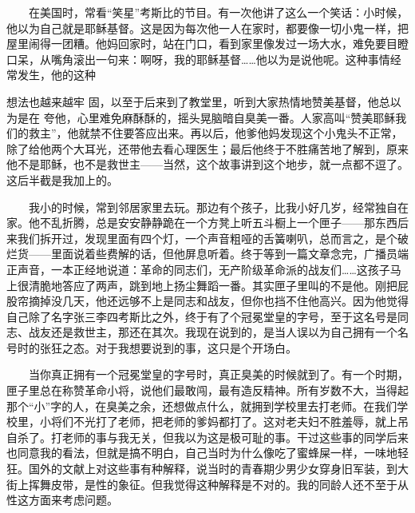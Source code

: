 　　在美国时，常看“笑星”考斯比的节目。有一次他讲了这么一个笑话：小时候，他以为自己就是耶稣基督。这是因为每次他一人在家时，都要像一切小鬼一样，把屋里闹得一团糟。他妈回家时，站在门口，看到家里像发过一场大水，难免要目瞪口呆，从嘴角滚出一句来：啊呀，我的耶稣基督……他以为是说他呢。这种事情经常发生，他的这种

想法也越来越牢
固，以至于后来到了教堂里，听到大家热情地赞美基督，他总以为是在
夸他，心里难免麻酥酥的，摇头晃脑暗自臭美一番。人家高叫“赞美耶稣我们的救主”，他就禁不住要答应出来。再以后，他爹他妈发现这个小鬼头不正常，除了给他两个大耳光，还带他去看心理医生；最后他终于不胜痛苦地了解到，原来他不是耶稣，也不是救世主——当然，这个故事讲到这个地步，就一点都不逗了。这后半截是我加上的。

　　我小的时候，常到邻居家里去玩。那边有个孩子，比我小好几岁，经常独自在家。他不乱折腾，总是安安静静跪在一个方凳上听五斗橱上一个匣子——那东西后来我们拆开过，发现里面有四个灯，一个声音粗哑的舌簧喇叭，总而言之，是个破烂货——里面说着些费解的话，但他屏息听着。终于等到一篇文章念完，广播员端正声音，一本正经地说道：革命的同志们，无产阶级革命派的战友们……这孩子马上很清脆地答应了两声，跳到地上扬尘舞蹈一番。其实匣子里叫的不是他。刚把屁股帘摘掉没几天，他还远够不上是同志和战友，但你也挡不住他高兴。因为他觉得自己除了名字张三李四考斯比之外，终于有了个冠冕堂皇的字号，至于这名号是同志、战友还是救世主，那还在其次。我现在说到的，是当人误以为自己拥有一个名号时的张狂之态。对于我想要说到的事，这只是个开场白。

　　当你真正拥有一个冠冕堂皇的字号时，真正臭美的时候就到了。有一个时期，匣子里总在称赞革命小将，说他们最敢闯，最有造反精神。所有岁数不大，当得起那个“小”字的人，在臭美之余，还想做点什么，就拥到学校里去打老师。在我们学校里，小将们不光打了老师，把老师的爹妈都打了。这对老夫妇不胜羞辱，就上吊自杀了。打老师的事与我无关，但我以为这是极可耻的事。干过这些事的同学后来也同意我的看法，但就是搞不明白，自己当时为什么像吃了蜜蜂屎一样，一味地轻狂。国外的文献上对这些事有种解释，说当时的青春期少男少女穿身旧军装，到大街上挥舞皮带，是性的象征。但我觉得这种解释是不对的。我的同龄人还不至于从性这方面来考虑问题。

